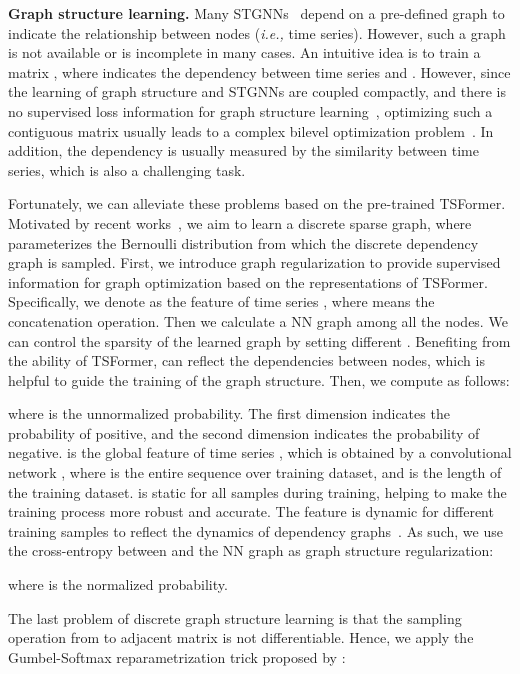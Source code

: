 \documentclass[sigconf]{acmart}
\newcommand{\ie}{\textit{i.e.,}\xspace}
\begin{document}
\noindent\textbf{Graph structure learning.} Many STGNNs~\cite{2017DCRNN, GWNet,2020GMAN} depend on a pre-defined graph to indicate the relationship between nodes (\ie time series). 
However, such a graph is not available or is incomplete in many cases.
An intuitive idea is to train a matrix , where  indicates the dependency between time series  and .
However, since the learning of graph structure and STGNNs are coupled compactly, and there is no supervised loss information for graph structure learning~\cite{2021REST}, optimizing such a contiguous matrix usually leads to a complex bilevel optimization problem~\cite{2019LDS}.
In addition, the dependency  is usually measured by the similarity between time series, which is also a challenging task.

Fortunately, we can alleviate these problems based on the pre-trained TSFormer.
Motivated by recent works~\cite{2018NRI, 2019LDS, 2021GTS}, we aim to learn a discrete sparse graph, where  parameterizes the Bernoulli distribution from which the discrete dependency graph  is sampled.
First, we introduce graph regularization to provide supervised information for graph optimization based on the representations of TSFormer.
Specifically, we denote  as the feature of time series , where  means the concatenation operation.
Then we calculate a NN graph  among all the nodes. We can control the sparsity of the learned graph by setting different .
Benefiting from the ability of TSFormer,  can reflect the dependencies between nodes, which is helpful to guide the training of the graph structure.
Then, we compute  as follows:

where  is the unnormalized probability. The first dimension indicates the probability of positive, and the second dimension indicates  the probability of negative.
{\color{black} is the global feature of time series , which is obtained by a convolutional network , where
 is the entire sequence  over training dataset, and  is the length of the training dataset.}
 is static for all samples during training, helping to make the training process more robust and accurate.
The feature  is dynamic for different training samples to reflect the dynamics of dependency graphs~\cite{2021DGCRN}.
As such, we use the cross-entropy between  and the NN graph  as graph structure regularization:

where  is the normalized probability.

The last problem of discrete graph structure learning is that the sampling operation from  to adjacent matrix  is not differentiable.
Hence, we apply the Gumbel-Softmax reparametrization trick proposed by \cite{Gumbel1, Gumbel2}:
\end{document}
